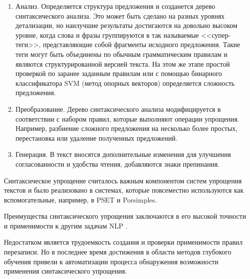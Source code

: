 \begin{enumerate}
	\item Анализ. Определяется структура предложения и созданется дерево синтаксического анализа. Это может быть сделано на разных уровнях детализации, но наилучшие результаты достигаются на довольно высоком уровне, когда слова и фразы группируются в так называемые <<супер-теги>>, представляющие собой фрагменты исходного предложения. Такие теги могут быть объединены по обычным грамматическим правилам и являются структурированной версией текста. На этом же этапе простой проверкой по заранее заданным правилам или с помощью бинарного классификатора SVM (метод опорных векторов)\cite{shardlow_survey_2014} определяется сложность предложения.
	
	\item Преобразование. Дерево синтаксического анализа модифицируется в соответствии с набором правил, которые выполняют операции упрощения. Например, разбиение сложного предложения на несколько более простых, перестановка или удаление полученных предложений\cite{hutchison_ernesta_2013}.
	
	\item Генерация. В текст вносятся дополнительные изменения для улучшения согласованности и удобства чтения, добавляются знаки препинания.
\end{enumerate}

Синтаксическое упрощение считалось важным компонентом систем упрощения текстов и было реализовано в системах, которые повсеместно используются как вспомогательные, например, в PSET\cite{alva} и Porsimples\cite{aluisio_fostering_2010}.

Преимущества синтаксического упрощения заключаются в его высокой точности и применимости к другим задачам NLP \cite{shardlow_survey_2014}. 

Недостатком является трудоемкость создания и проверки применимости правил перезаписи. Но в последнее время достижения в области методов глубокого обучения привели к автоматизации процесса обнаружения возможности применения синтаксического упрощения.

